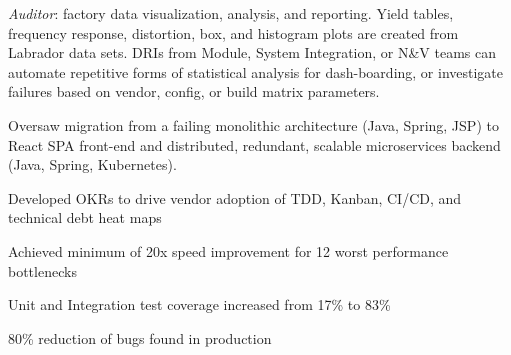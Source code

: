 \documentclass[]{jhearn-resume}
\begin{document}
\begin{minipage}[t]{0.64\textwidth}
\begin{tightemize}
\begin{tightemize}
	\item \emph{Auditor}: factory data visualization, analysis, and reporting. Yield tables, frequency response, distortion, box, and histogram plots are created from Labrador data sets. DRIs from Module, System Integration, or N\&V teams can automate repetitive forms of statistical analysis for dash-boarding, or investigate failures based on vendor, config, or build matrix parameters.
	\item Oversaw migration from a failing monolithic architecture (Java, Spring, JSP) to React SPA front-end and distributed, redundant, scalable microservices backend (Java, Spring, Kubernetes).
	\item Developed OKRs to drive vendor adoption of TDD, Kanban, CI/CD, and technical debt heat maps
	\item Achieved minimum of 20x speed improvement for 12 worst performance bottlenecks
	\item Unit and Integration test coverage increased from 17\% to 83\%
	\item 80\% reduction of bugs found in production
	\end{tightemize}
\end{tightemize}
\sectionsep


\end{minipage} 
\hfill
\end{document}
